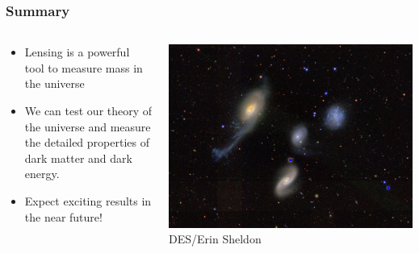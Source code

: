 \documentclass{beamer}
\begin{document}
\frame
{

    \frametitle{Summary}


    \begin{columns}
        \begin{column}{0.5\textwidth}
            \begin{itemize}

                \item Lensing is a powerful tool to measure mass in the
                    universe

                \item We can test our theory of the universe and measure the
                    detailed properties of dark matter and dark energy.

                \item Expect exciting results in the near future!

            \end{itemize}

        \end{column}
        \begin{column}{0.5\textwidth}
            \begin{center}
                \includegraphics[width=1.2\textwidth, angle=-90]{DES0022-4831-four.jpg}
                \newline
                {\tiny DES/Erin Sheldon}
            \end{center}
        \end{column}

    \end{columns}


}
\end{document}
